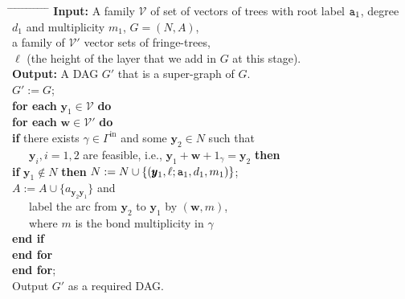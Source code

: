 \documentclass[12pt]{article}
\newcommand{\inn}{\mathrm{in}}
\newcommand{\V}{{\rm V}}
\newcommand{\ta}{{\tt a}}
\newcommand{\tb}{{\tt b}}
\newcommand{\w}{\pmb{w}}
\newcommand{\y}{\pmb{y}}
\newcommand{\x}{\pmb{x}}
\newcommand{\1}{\pmb{1}}
\newcommand{\0}{\pmb{0}}
\newcommand{\val}{\mathrm{val}}
\newcommand{\inl}{\mathrm{inl}}
\newcommand{\Vv}{\mathcal{V}}
\begin{document}
\begin{tabbing}
%
\hspace{3mm} \= \hspace{3mm} \= \hspace{3mm} \= \hspace{3mm} \= %
\hspace{3mm} \= \hspace{3mm} \= \hspace{3mm} \= \hspace{3mm} \= %
\hspace{3mm} \= \hspace{3mm} \= \hspace{3mm} \= \hspace{3mm}  \kill
{\bf Input:} 
A family $\Vv$ of set of vectors of trees 
with root label $\ta_1$, degree \+ \\
$d_1$ and multiplicity $m_1$, 
$G = (N, A)$,  \\
a family of   
                 $\Vv'$ vector sets of fringe-trees, \\
                 $\ell$ (the height of the layer  
                 that we add in $G$ at this stage).\- \\
%                 
{\bf Output:}  A DAG $G'$ that is a super-graph of $G$.\\
%
$G':= G$;\\
{\bf for each} $\y_1 \in \Vv$ {\bf do} \+ \\%
	{\bf for each} $\w \in \Vv'$ {\bf do} \+ \\%
		{\bf if } there exists $\gamma \in \Gamma^{\inn}$ and 
		some $\y_2 \in N$ such that \\
		~~~$\y_i, i=1,2$ are feasible, i.e., 
		$\y_1 +\w+1_{\gamma} = \y_2$ {\bf then}\+\\%
				{\bf if} $\y_1 \not\in N$ {\bf then} 
				$N:= N \cup \{(\y_1, \ell;  \ta_1, 
				d_1, m_1)\}$;\\
				$A:= A \cup \{a_{\y_2\y_1}\}$ and \\
			~~~label the arc from 
				$\y_2$ to $\y_1$ by $(\w, m)$, \\
				~~~where $m$ is 
				the bond multiplicity in $\gamma$\- \\
                 
               {\bf end if} \-\\%
	{\bf end for} \- \\%
{\bf end for};  \\%
Output $G'$ as a required DAG.
\end{tabbing}
\end{document}
